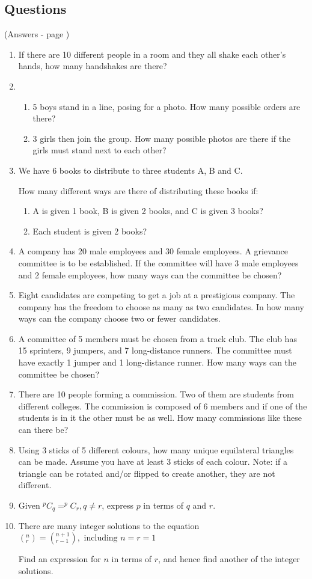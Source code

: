 \documentclass[../main.tex]{subfiles}
\begin{document}
\subsection*{Questions}
(Answers - page \pageref{Combinations answers})
\label{Combinations and permuations}
\begin{enumerate}[itemsep=1cm]
    \item 
    If there are 10 different people in a room and they all shake each other’s hands, how many handshakes are there?
    \item 
        \begin{enumerate}
            \item 5 boys stand in a line, posing for a photo. How many possible orders are there?
            \item 3 girls then join the group. How many possible photos are there if the girls must stand next to each other?
        \end{enumerate}
    \item 
    We have 6 books to distribute to three students A, B and C.

    How many different ways are there of distributing these books if:
        \begin{enumerate}
            \item A is given 1 book, B is given 2 books, and C is given 3 books?
            \item Each student is given 2 books?
        \end{enumerate}
    \item 
    A company has 20 male employees and 30 female employees. A grievance committee is to be established. If the committee will have 3 male employees and 2 female employees, how many ways can the committee be chosen?
    \item 
    Eight candidates are competing to get a job at a prestigious company. The company has the freedom to choose as many as two candidates. In how many ways can the company choose two or fewer candidates.
    \item 
    A committee of 5 members must be chosen from a track club. The club has 15 sprinters, 9 jumpers, and 7 long-distance runners. The committee must have exactly 1 jumper and 1 long-distance runner. How many ways can the committee be chosen?
    \item 
    There are 10 people forming a commission. Two of them are students from different colleges. The commission is composed of 6 members and if one of the students is in it the other must be as well. How many commissions like these can there be?
    \item 
    Using 3 sticks of 5 different colours, how many unique equilateral triangles can be made. Assume you have at least 3 sticks of each colour. Note: if a triangle can be rotated and/or flipped to create another, they are not different.
    \item 
    Given \(^pC_q=^pC_r, q\neq r\), express \(p\) in terms of \(q\) and \(r\).
    \item 
    There are many integer solutions to the equation \((^n_r)=(^{n+1}_{r-1}),\text{ including } n=r=1 \)
    
    Find an expression for \(n\) in terms of \(r\), and hence find another of the integer solutions.
\end{enumerate}
\end{document}
